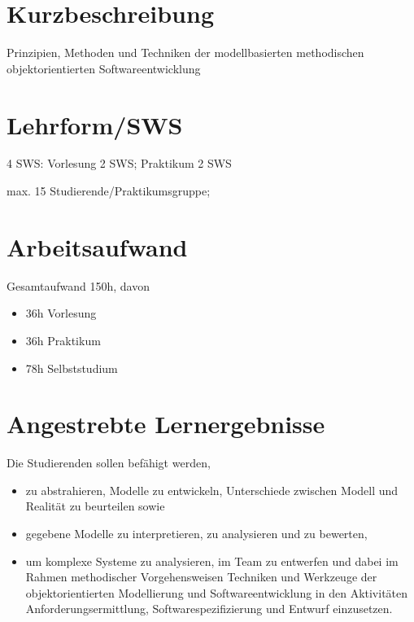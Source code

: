 \section*{Kurzbeschreibung\label{/mi-2017/modulbeschreibungen-bachelor/BA_Softwaretechnik}}\label{kurzbeschreibungpathlabelmi-2017modulbeschreibungen-bachelorbaux5fsoftwaretechnik}

Prinzipien, Methoden und Techniken der modellbasierten methodischen
objektorientierten Softwareentwicklung

\section*{Lehrform/SWS\label{/mi-2017/modulbeschreibungen-bachelor/BA_Softwaretechnik}}\label{lehrformswspathlabelmi-2017modulbeschreibungen-bachelorbaux5fsoftwaretechnik}

4 SWS: Vorlesung 2 SWS; Praktikum 2 SWS

max. 15 Studierende/Praktikumsgruppe;

\section*{Arbeitsaufwand\label{/mi-2017/modulbeschreibungen-bachelor/BA_Softwaretechnik}}\label{arbeitsaufwandpathlabelmi-2017modulbeschreibungen-bachelorbaux5fsoftwaretechnik}

Gesamtaufwand 150h, davon

\begin{itemize}
\tightlist
\item
  36h Vorlesung
\item
  36h Praktikum
\item
  78h Selbststudium
\end{itemize}

\section*{Angestrebte
Lernergebnisse\label{/mi-2017/modulbeschreibungen-bachelor/BA_Softwaretechnik}}\label{angestrebte-lernergebnissepathlabelmi-2017modulbeschreibungen-bachelorbaux5fsoftwaretechnik}

Die Studierenden sollen befähigt werden,

\begin{itemize}
\tightlist
\item
  zu abstrahieren, Modelle zu entwickeln, Unterschiede zwischen Modell
  und Realität zu beurteilen sowie
\item
  gegebene Modelle zu interpretieren, zu analysieren und zu bewerten,
\item
  um komplexe Systeme zu analysieren, im Team zu entwerfen und dabei im
  Rahmen methodischer Vorgehensweisen Techniken und Werkzeuge der
  objektorientierten Modellierung und Softwareentwicklung in den
  Aktivitäten Anforderungsermittlung, Softwarespezifizierung und Entwurf
  einzusetzen.
\end{itemize}

